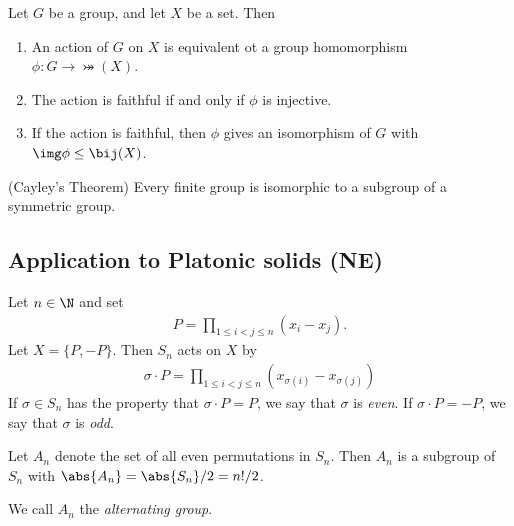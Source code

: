 \documentclass{article}
\begin{document}
\begin{theorem}
	Let $G$ be a group, and let $X$ be a set. Then
	\begin{enumerate}
		\item An action of $G$ on $X$ is equivalent ot a group homomorphism $\phi:G\to\bij(X)$.
		\item The action is faithful if and only if $\phi$ is injective.
		\item If the action is faithful, then $\phi$ gives an isomorphism of $G$ with $\img\phi\leq\bij(X)$.
	\end{enumerate}
\end{theorem}

\begin{corollary}(Cayley's Theorem)
	Every finite group is isomorphic to a subgroup of a symmetric group.
\end{corollary}

\subsection{Application to Platonic solids (NE)}

\begin{definition}
	Let $n\in\N$ and set
	\begin{align*}
		P=\prod_{1\leq i<j\leq n}(x_i-x_j).
	\end{align*}
	Let $X=\{P,-P\}$. Then $S_n$ acts on $X$ by
	\begin{align*}
		\sigma\cdot P= \prod_{1\leq i < j \leq n} (x_{\sigma(i)}-x_{\sigma(j)})
	\end{align*}
	If $\sigma\in S_n$ has the property that $\sigma\cdot P=P$,
	we say that $\sigma$ is \emph{even}. If $\sigma\cdot P=-P$,
	we say that $\sigma$ is \emph{odd}.
\end{definition}

\setcounter{theorem}{3}
\begin{theorem}
	Let $A_n$ denote the set of all even permutations in $S_n$.
	Then $A_n$ is a subgroup of $S_n$ with $\abs{A_n}=
		\abs{S_n}/2 = n!/2$.
\end{theorem}

\begin{definition}
	We call $A_n$ the \emph{alternating group}.
\end{definition}
\end{document}
